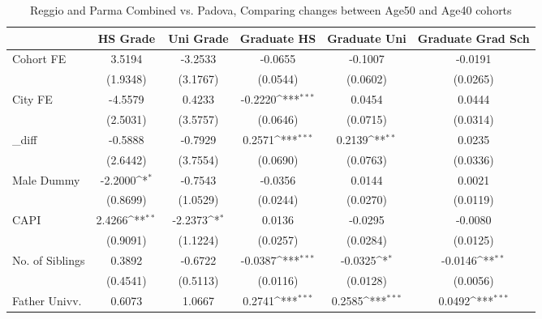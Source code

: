 \begin{table}[htbp]\centering
\def\sym#1{\ifmmode^{#1}\else\(^{#1}\)\fi}
\caption{Reggio and Parma Combined vs. Padova, Comparing changes between Age50 and Age40 cohorts}
\begin{tabular}{l*{5}{c}}
\toprule
            &\multicolumn{1}{c}{HS Grade}&\multicolumn{1}{c}{Uni Grade}&\multicolumn{1}{c}{Graduate HS}&\multicolumn{1}{c}{Graduate Uni}&\multicolumn{1}{c}{Graduate Grad Sch}\\
\midrule
Cohort FE   &      3.5194         &     -3.2533         &     -0.0655         &     -0.1007         &     -0.0191         \\
            &    (1.9348)         &    (3.1767)         &    (0.0544)         &    (0.0602)         &    (0.0265)         \\
\addlinespace
City FE     &     -4.5579         &      0.4233         &     -0.2220\sym{***}&      0.0454         &      0.0444         \\
            &    (2.5031)         &    (3.5757)         &    (0.0646)         &    (0.0715)         &    (0.0314)         \\
\addlinespace
\_diff       &     -0.5888         &     -0.7929         &      0.2571\sym{***}&      0.2139\sym{**} &      0.0235         \\
            &    (2.6442)         &    (3.7554)         &    (0.0690)         &    (0.0763)         &    (0.0336)         \\
\addlinespace
Male Dummy  &     -2.2000\sym{*}  &     -0.7543         &     -0.0356         &      0.0144         &      0.0021         \\
            &    (0.8699)         &    (1.0529)         &    (0.0244)         &    (0.0270)         &    (0.0119)         \\
\addlinespace
CAPI        &      2.4266\sym{**} &     -2.2373\sym{*}  &      0.0136         &     -0.0295         &     -0.0080         \\
            &    (0.9091)         &    (1.1224)         &    (0.0257)         &    (0.0284)         &    (0.0125)         \\
\addlinespace
No. of Siblings&      0.3892         &     -0.6722         &     -0.0387\sym{***}&     -0.0325\sym{*}  &     -0.0146\sym{**} \\
            &    (0.4541)         &    (0.5113)         &    (0.0116)         &    (0.0128)         &    (0.0056)         \\
\addlinespace
Father Univv.&      0.6073         &      1.0667         &      0.2741\sym{***}&      0.2585\sym{***}&      0.0492\sym{***}\\

\end{tabular}
\end{table}
